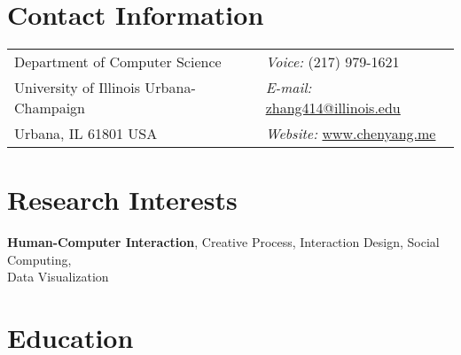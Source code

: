 \documentclass[margin,line]{res}
\newenvironment{list1}{
  \begin{list}{\ding{113}}{%
      \setlength{\itemsep}{0in}
      \setlength{\parsep}{0in} \setlength{\parskip}{0in}
      \setlength{\topsep}{0in} \setlength{\partopsep}{0in} 
      \setlength{\leftmargin}{0.17in}}}{\end{list}}
\newenvironment{list2}{
  \begin{list}{$\bullet$}{%
      \setlength{\itemsep}{0in}
      \setlength{\parsep}{0in} \setlength{\parskip}{0in}
      \setlength{\topsep}{0in} \setlength{\partopsep}{0in} 
      \setlength{\leftmargin}{0.2in}}}{\end{list}}
\begin{document}

\begin{resume}
\section{Contact Information}
\vspace{.05in}
\begin{tabular}{@{}p{3in}p{4in}}
Department of Computer Science   & {\it Voice:}    (217) 979-1621 \\         
University of Illinois Urbana-Champaign & {\it E-mail:} \href{mailto:zhang414@illinois.edu}{zhang414@illinois.edu}\\
Urbana, IL  61801 USA  & {\it Website:} \href{http://www.chenyang.me}{www.chenyang.me} \\     
\end{tabular}


\section{Research Interests}
\textbf{Human-Computer Interaction}, Creative Process, Interaction Design, Social Computing,\\ Data Visualization

\section{Education}


\end{resume}
\end{document}

